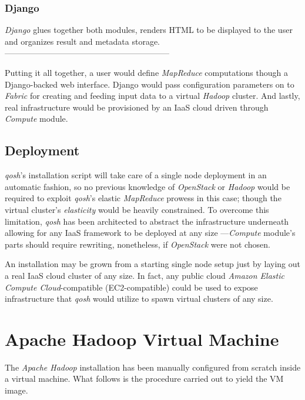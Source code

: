 \documentclass{sig-alternate}
\begin{document}
\subsubsection{Django}
\noindent \emph{Django} glues together both modules, renders HTML to be displayed to the user and organizes result and metadata storage.------------------------------------------------------------

Putting it all together, a user would define \emph{MapReduce} computations though a Django-backed web interface. Django would pass configuration parameters on to \emph{Fabric} for creating and feeding input data to a virtual \emph{Hadoop} cluster. And lastly, real infrastructure would be provisioned by an IaaS cloud driven through \emph{Compute} module.


\subsection{Deployment}
\noindent \emph{qosh}'s installation script will take care of a single node deployment in an automatic fashion, so no previous knowledge of \emph{OpenStack} or \emph{Hadoop} would be required to exploit \emph{qosh}'s elastic \emph{MapReduce} prowess in this case; though the virtual cluster's \emph{elasticity} would be heavily constrained. To overcome this limitation, \emph{qosh} has been architected to abstract the infrastructure underneath allowing for any IaaS framework to be deployed at any size ---\emph{Compute} module's parts should require rewriting, nonetheless, if \emph{OpenStack} were not chosen.

An installation may be grown from a starting single node setup just by laying out a real IaaS cloud cluster of any size. In fact, any public cloud \emph{Amazon Elastic Compute Cloud}-compatible (EC2-compatible) could be used to expose infrastructure that \emph{qosh} would utilize to spawn virtual clusters of any size.


\section{Apache Hadoop Virtual Machine}
\noindent The \emph{Apache Hadoop} installation has been manually configured from scratch inside a virtual machine. What follows is the procedure carried out to yield the VM image.
\end{document}
